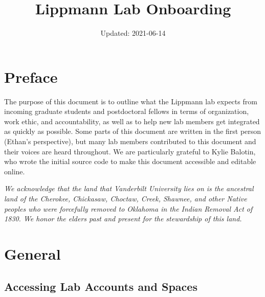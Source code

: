 \documentclass[
]{book}
\title{Lippmann Lab Onboarding}
\author{}
\date{\vspace{-2.5em}Updated: 2021-06-14}
\begin{document}
\maketitle

{
\setcounter{tocdepth}{1}
\tableofcontents
}
\hypertarget{preface}{%
\chapter*{Preface}\label{preface}}

The purpose of this document is to outline what the Lippmann lab expects from incoming graduate students and postdoctoral fellows in terms of organization, work ethic, and accountability, as well as to help new lab members get integrated as quickly as possible. Some parts of this document are written in the first person (Ethan's perspective), but many lab members contributed to this document and their voices are heard throughout. We are particularly grateful to Kylie Balotin, who wrote the initial source code to make this document accessible and editable online.

\emph{We acknowledge that the land that Vanderbilt University lies on is the ancestral land of the Cherokee, Chickasaw, Choctaw, Creek, Shawnee, and other Native peoples who were forcefully removed to Oklahoma in the Indian Removal Act of 1830. We honor the elders past and present for the stewardship of this land.}

\hypertarget{general}{%
\chapter{General}\label{general}}

\hypertarget{access}{%
\section{Accessing Lab Accounts and Spaces}\label{access}}
\end{document}
